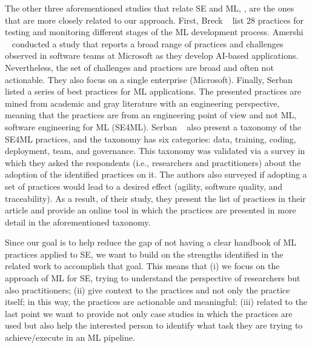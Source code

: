 The other three aforementioned studies that relate SE  and ML, \cite{breck2017ml, amershi2019software, serban2020adoption}, are the ones that are more closely related to our approach. First, Breck \etal~\cite{breck2017ml}  list 28 practices for testing and monitoring different stages of the ML development process. Amershi \etal~\cite{amershi2019software} conducted a study that reports a broad range of practices and challenges observed  in software teams at Microsoft as they develop AI-based applications. Nevertheless, the set of challenges and practices are broad and often not actionable. They  also focus on a single enterprise (Microsoft).  Finally, Serban \etal~\cite{serban2020adoption} listed  a series of best practices for ML applications.  The presented practices are mined  from academic and gray literature with an engineering perspective, meaning that  the practices are from an engineering point of view and not ML, software engineering for ML (SE4ML).  Serban \etal~\cite{serban2020adoption}  also present a taxonomy of the SE4ML practices, and the taxonomy has  six categories: data, training, coding, deployment, team, and governance. This taxonomy was validated via a  survey in which they asked the respondents (i.e., researchers and practitioners) about the adoption of the  identified  practices on it. The authors also surveyed if adopting a set of practices would lead to a desired effect (\eg agility, software quality, and traceability).  As a result, of their study, they present the list of practices in their article and provide an online tool in which the practices are presented in more detail in the aforementioned taxonomy. 


Since our  goal is to help  reduce the gap of not having a clear handbook of ML practices applied to SE, we want to build on the strengths identified in the related work to accomplish that goal. This means that (i) we focus on the approach of ML for SE, trying to understand the perspective of researchers but also practitioners; (ii) give context to the practices and not only the practice itself; in this way, the practices are actionable and meaningful; (iii) related to the last point we want to provide not only case studies in which the practices are used but also help the interested person to identify what task they are trying to achieve/execute in an ML pipeline.


